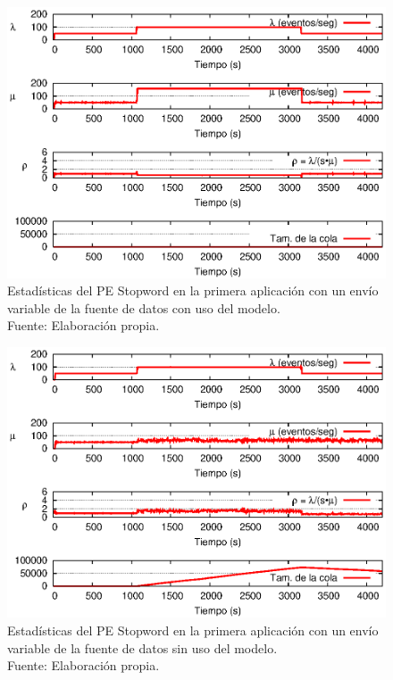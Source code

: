 \begin{figure}[!ht]
    \centering
    \captionsetup{justification=centering}
    \includegraphics[scale=1]{images/exp/app1/normal/cm/statusStopwordPE.eps}
    \caption[Estadísticas del PE Stopword en la primera aplicación con un envío variable de la fuente de datos con uso del modelo.]{Estadísticas del PE Stopword en la primera aplicación con un envío variable de la fuente de datos con uso del modelo.\\Fuente: Elaboración propia.}
    \label{fig:app1-normal-statusStopwordPE-cm}
\end{figure}

\begin{figure}[!ht]
    \centering
    \captionsetup{justification=centering}
    \includegraphics[scale=1]{images/exp/app1/normal/sm/statusStopwordPE.eps}
    \caption[Estadísticas del PE Stopword en la primera aplicación con un envío variable de la fuente de datos sin uso del modelo.]{Estadísticas del PE Stopword en la primera aplicación con un envío variable de la fuente de datos sin uso del modelo.\\Fuente: Elaboración propia.}
    \label{fig:app1-normal-statusStopwordPE-sm}
\end{figure}

